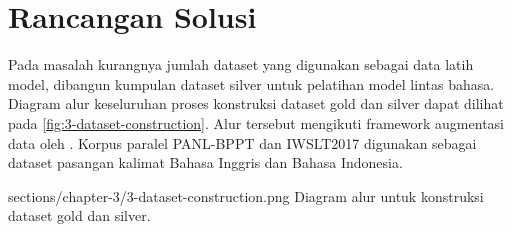 \section{Rancangan Solusi}

Pada masalah kurangnya jumlah dataset yang digunakan sebagai data latih model, dibangun kumpulan dataset silver untuk pelatihan model \amrparsing{} lintas bahasa.
Diagram alur keseluruhan proses konstruksi dataset gold dan silver dapat dilihat pada \cref{fig:3-dataset-construction}.
Alur tersebut mengikuti framework augmentasi data oleh \textcite{lee2022}.
Korpus paralel PANL-BPPT dan IWSLT2017 digunakan sebagai dataset pasangan kalimat Bahasa Inggris dan Bahasa Indonesia.


  {sections/chapter-3/3-dataset-construction.png}
  {Diagram alur untuk konstruksi dataset gold dan silver.}
